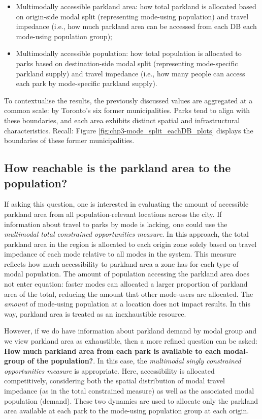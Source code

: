 \documentclass[
11pt, %
oneside, %
english, %
singlespacing, %
]{macthesis} %
\def\tightlist{}
\begin{document}
\begin{itemize}
\tightlist
\item
  Multimodally accessible parkland area: how total parkland is allocated based on origin-side modal split (representing mode-using population) and travel impedance (i.e., how much parkland area can be accessed from each DB each mode-using population group);
\item
  Multimodally accessible population: how total population is allocated to parks based on destination-side modal split (representing mode-specific parkland supply) and travel impedance (i.e., how many people can access each park by mode-specific parkland supply).
\end{itemize}

To contextualise the results, the previously discussed values are aggregated at a common scale: by Toronto's six former municipalities. Parks tend to align with these boundaries, and each area exhibits distinct spatial and infrastructural characteristics. Recall: Figure \ref{fig:chp3-mode_split_eachDB_plots} displays the boundaries of these former municipalities.

\subsection{\texorpdfstring{\textbf{How reachable is the parkland area to the population?}}{How reachable is the parkland area to the population?}}\label{how-reachable-is-the-parkland-area-to-the-population}

If asking this question, one is interested in evaluating the amount of accessible parkland area from all population-relevant locations across the city. If information about travel to parks by mode is lacking, one could use the \emph{multimodal total constrained opportunities measure}. In this approach, the total parkland area in the region is allocated to each origin zone solely based on travel impedance of each mode relative to all modes in the system. This measure reflects how much accessibility to parkland area a zone has for each type of modal population. The amount of population accessing the parkland area does not enter equation: faster modes can allocated a larger proportion of parkland area of the total, reducing the amount that other mode-users are allocated. The \emph{amount} of mode-using population at a location does not impact results. In this way, parkland area is treated as an inexhaustible resource.

However, if we do have information about parkland demand by modal group and we view parkland area as exhaustible, then a more refined question can be asked: \textbf{How much parkland area from each park is available to each modal-group of the population?}. In this case, the \emph{multimodal singly constrained opportunities measure} is appropriate. Here, accessibility is allocated competitively, considering both the spatial distribution of modal travel impedance (as in the total constrained measure) as well as the associated modal population (demand). These two dynamics are used to allocate only the parkland area available at each park to the mode-using population group at each origin.
\end{document}
